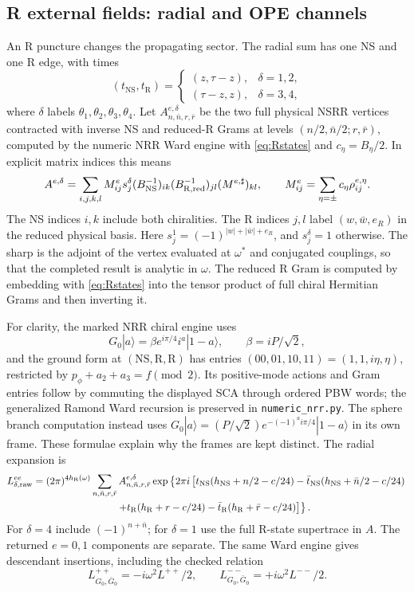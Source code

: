 \documentclass[11pt]{article}
\newcommand{\NS}{\mathrm{NS}}
\newcommand{\R}{\mathrm{R}}
\newcommand{\code}[1]{\texttt{\small #1}}
\begin{document}
\subsection{R external fields: radial and OPE channels}
\label{sec:rr-torus}
An R puncture changes the propagating sector. The radial sum has
one NS and one R edge, with times
\[
 (t_\NS,t_\R)=
 \begin{cases}(z,\tau-z),&\delta=1,2,\\
              (\tau-z,z),&\delta=3,4,\end{cases}
\]
where \(\delta\) labels \(\theta_1,\theta_2,\theta_3,\theta_4\).
Let \(A^{e,\delta}_{n,\bar n,r,\bar r}\) be the two full physical
NSRR vertices contracted with inverse NS and reduced-R Grams at
levels \((n/2,\bar n/2;r,\bar r)\), computed by the numeric NRR Ward
engine with \eqref{eq:Rstates} and \(c_\eta=B_\eta/2\).
In explicit matrix indices this means
\begin{equation}
 A^{e,\delta}=\sum_{i,j,k,l}
 M^e_{ij}s_j^\delta(B_\NS^{-1})_{ik}
 (B_{\R,\rm red}^{-1})_{jl}(M^{e,\sharp})_{kl},\qquad
 M^e_{ij}=\sum_{\eta=\pm}c_\eta\rho^{e,\eta}_{ij}.
\end{equation}
The NS indices \(i,k\) include both chiralities. The R indices
\(j,l\) label \((w,\bar w,e_R)\) in the reduced physical basis.
Here \(s_j^1=(-1)^{|w|+|\bar w|+e_R}\), and \(s_j^\delta=1\)
otherwise. The sharp is the adjoint of the vertex evaluated at
\(\omega^*\) and conjugated couplings, so that the completed result
is analytic in \(\omega\). The reduced R Gram is computed by
embedding with \eqref{eq:Rstates} into the tensor product of full
chiral Hermitian Grams and then inverting it.

For clarity, the marked NRR chiral engine uses
\[
 G_0|a\rangle=\beta e^{i\pi/4}i^a|1-a\rangle,\qquad
 \beta=iP/\sqrt2,
\]
and the ground form at \((\NS,\R,\R)\) has entries
\((00,01,10,11)=(1,1,i\eta,\eta)\), restricted by
\(p_\phi+a_2+a_3=f\pmod2\). Its positive-mode actions and Gram
entries follow by commuting the displayed SCA through ordered PBW
words; the generalized Ramond Ward recursion is preserved in
\code{numeric\_nrr.py}. The sphere branch computation instead uses
\(G_0|a\rangle=(P/\sqrt2)e^{-(-1)^ai\pi/4}|1-a\rangle\) in
its own frame. These formulae explain why the frames are kept distinct.
The radial expansion is
\begin{align}
 L_{\delta,\rm raw}^{ee}
 &=(2\pi)^{4h_\R(\omega)}
 \sum_{n,\bar n,r,\bar r}A^{e,\delta}_{n,\bar n,r,\bar r}
 \exp\left\{2\pi i\left[
 t_\NS(h_\NS+n/2-c/24)-\bar t_\NS(h_\NS+\bar n/2-c/24)
 \right.\right.\nonumber\\
 &\hspace{29mm}\left.\left.
 +t_\R(h_\R+r-c/24)-\bar t_\R(h_\R+\bar r-c/24)
 \right]\right\}.
\end{align}
For \(\delta=4\) include \((-1)^{n+\bar n}\);
for \(\delta=1\) use the full R-state supertrace in \(A\).
The returned \(e=0,1\) components are separate. The same Ward
engine gives descendant insertions, including the checked relation
\[
 L^{++}_{G_0,\bar G_0}=-i\omega^2L^{++}/2,\qquad
 L^{--}_{G_0,\bar G_0}=+i\omega^2L^{--}/2.
\]
\end{document}
